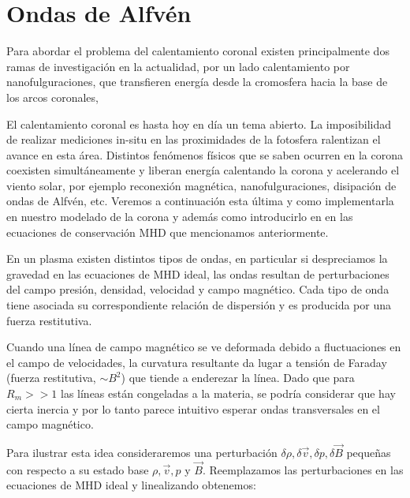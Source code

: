 \documentclass[a4paper,11pt]{report}
\begin{document}
\section{Ondas de Alfvén}\label{seccion_alfven}

Para abordar el problema del calentamiento coronal existen principalmente dos ramas de investigación en la actualidad, por un lado calentamiento por nanofulguraciones, que transfieren energía desde la cromosfera hacia la base de los arcos coronales, 

El calentamiento coronal es hasta hoy en día un tema abierto. La imposibilidad de realizar mediciones in-situ en las proximidades de la fotosfera ralentizan el avance en esta área. Distintos fenómenos físicos que se saben ocurren en la corona coexisten simultáneamente y liberan energía calentando la corona y acelerando el viento solar, por ejemplo reconexión magnética, nanofulguraciones, disipación de ondas de Alfvén, etc. Veremos a continuación esta última y como implementarla en nuestro modelado de la corona y además como introducirlo en en las ecuaciones de conservación MHD que mencionamos anteriormente.


En un plasma existen distintos tipos de ondas, en particular si despreciamos la gravedad en las ecuaciones de MHD ideal, las ondas resultan de perturbaciones del campo presión, densidad, velocidad y campo magnético. Cada tipo de onda tiene asociada su correspondiente relación de dispersión y es producida por una fuerza restitutiva. %

Cuando una línea de campo magnético se ve deformada debido a fluctuaciones en el campo de velocidades, la curvatura resultante da lugar a tensión de Faraday (fuerza restitutiva, $\sim B^2$) que tiende a enderezar la línea. Dado que para $R_m >> 1$ las líneas están congeladas a la materia, se podría considerar que hay cierta inercia y por lo tanto parece intuitivo esperar ondas transversales en el campo magnético. 




Para ilustrar esta idea consideraremos una perturbación $\delta \rho, \delta \vec{v},\delta p, \delta \vec{B}$ pequeñas con respecto a su estado base $\rho,  \vec{v}, p$ y $\vec{B}$. Reemplazamos las perturbaciones en las ecuaciones de MHD ideal y linealizando obtenemos:
\end{document}
